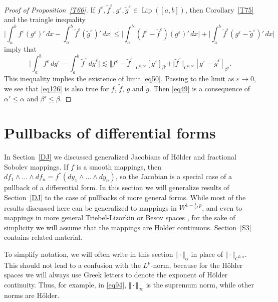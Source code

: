 \documentclass[intlimits,12pt,reqno]{amsart}
\newcommand{\eps}{\varepsilon}
\numberwithin{equation}{section}
\def\lip{\operatorname{Lip}}
\theoremstyle{definition}
\begin{document}
\begin{proof}[Proof of Proposition~\ref{T66}]
If $f^\eps,\tilde{f}^\eps,g^\eps,\tilde{g}^\eps\in\lip([a,b])$, then Corollary~\ref{T75} and the traingle inequality  
$$
\Bigg|\int_a^b f^\eps (g^\eps)'\, dx-\int_a^b\tilde{f}^\eps(\tilde{g}^\eps)'\, dx\Bigg|
\leq 
\Bigg|\int_a^b (f^\eps-\tilde{f}^\eps)(g^\eps)'\, dx\Bigg|+
\Bigg|\int_a^b \tilde{f}^\eps(g^\eps-\tilde{g}^\eps)'\, dx\Bigg|
$$
imply that 
\begin{equation}
\label{eq126}
\Bigg|\int_a^b f^\eps\, dg^\eps-\int_a^b \tilde{f}^\eps\, d\tilde{g}^\eps\Bigg|\lesssim
\Vert f^\eps-\tilde{f}^\eps\Vert_{C^{0,\alpha'}}[g^\eps]_{\beta'}+
\Vert\tilde{f}^\eps\Vert_{C^{0,\alpha'}}[g^\eps-\tilde{g}^\eps]_{\beta'}.
\end{equation}
This inequality implies the existence of limit \eqref{eq50}. Passing to the limit as $\eps\to 0$, we see that 
\eqref{eq126} is also true for $f$, $\tilde{f}$, $g$ and $\tilde{g}$. Then \eqref{eq49} is a consequence of $\alpha'\leq\alpha$ and $\beta'\leq\beta$.
\end{proof}




\section{Pullbacks of differential forms}
\label{S6}

In Section~\ref{DJ} we discussed generalized Jacobians of H\"older and fractional Sobolev mappings. If $f$ is a smooth mappings, then 
$df_1\wedge\ldots\wedge df_n=f^*(dy_1\wedge\ldots\wedge dy_n)$, so the Jacobian is a special case of a pullback of a differential form.
In this section we will generalize results of Section~\ref{DJ} to the case of pullbacks of more general forms. While most of the results discussed here  can be generalized to mappings in
$W^{1-\frac{1}{p},p}$, and even to mappings in more general  Triebel-Lizorkin or Besov spaces  \cite{SY1999}, for the sake of simplicity we will assume that the mappings are H\"older continuous.
Section~\ref{S3} contains related material.


To simplify notation, we will often write in this section $\Vert\cdot\Vert_\alpha$ in place of
$\Vert\cdot\Vert_{C^{0,\alpha}}$. This should not lead to a confusion with the $L^p$-norm, because for the H\"older spaces we will always use Greek letters to denote the exponent of H\"older continuity. Thus, for example, in \eqref{eq94}, $\Vert\cdot\Vert_\infty$ is the supremum norm, while other norms are H\"older.
\end{document}

